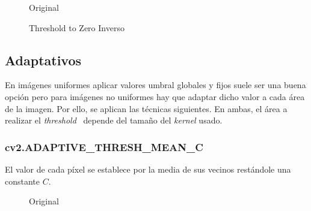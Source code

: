 \begin{figure}[H]
  \caption{Original}
  \centering \setlength\fboxsep{0pt} \setlength\fboxrule{0.5pt}
\end{figure}

\begin{figure}[H]
  \centering \setlength\fboxsep{0pt} \setlength\fboxrule{0.5pt}
  \caption{Threshold to Zero Inverso}
\end{figure}

\subsection{Adaptativos}
En imágenes uniformes aplicar valores umbral globales y fijos suele
ser una buena opción pero para imágenes no uniformes hay que adaptar
dicho valor a cada área de la imagen. Por ello, se aplican las
técnicas siguientes. En ambas, el área a realizar el
\emph{threshold}~\emph{\citep*[6.2 Adaptive
  Thresholding]{fisher1996hypermedia}} depende del tamaño del
\emph{kernel} usado.

\subsubsection{cv2.ADAPTIVE\_THRESH\_MEAN\_C}
El valor de cada píxel se establece por la media de sus vecinos
restándole una constante $C$.

\begin{figure}[H]
  \caption{Original}
  \centering \setlength\fboxsep{0pt} \setlength\fboxrule{0.5pt}
\end{figure}


